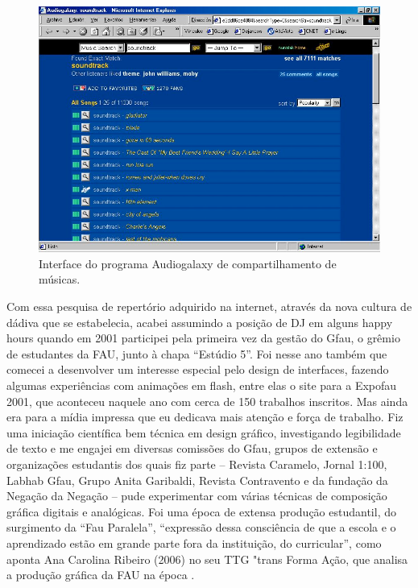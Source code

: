\begin{figure}
\centering
\includegraphics[width=1\textwidth]{pictures/cap1/audiogalaxy}
\caption{Interface do programa Audiogalaxy de compartilhamento de músicas.}
\label{fig:audiogalaxy}
\end{figure}


Com essa pesquisa de repertório adquirido na internet, através da nova cultura de dádiva que se estabelecia, acabei assumindo a posição de DJ em alguns happy hours quando em 2001 participei pela primeira vez da gestão do Gfau, o grêmio de estudantes da FAU, junto à chapa ``Estúdio 5''. Foi nesse ano também que comecei a desenvolver um interesse especial pelo design de interfaces, fazendo algumas experiências com animações em flash, entre elas o site para a Expofau 2001, que aconteceu naquele ano com cerca de 150 trabalhos inscritos. Mas ainda era para a mídia impressa que eu dedicava mais atenção e força de trabalho. Fiz uma iniciação científica bem técnica em design gráfico, investigando legibilidade de texto e me engajei em diversas comissões do Gfau, grupos de extensão e organizações estudantis dos quais fiz parte – Revista Caramelo, Jornal 1:100, Labhab Gfau, Grupo Anita Garibaldi, Revista Contravento e da fundação da Negação da Negação – pude experimentar com várias técnicas de composição gráfica digitais e analógicas. Foi uma época de extensa produção estudantil, do surgimento da ``Fau Paralela'', ``expressão dessa consciência de que a escola e o aprendizado estão em grande parte fora da instituição, do curricular'', como aponta Ana Carolina Ribeiro (2006) no seu TTG "trans Forma Ação, que analisa a produção gráfica da FAU na época \cite{Ribeiro2006}. 

